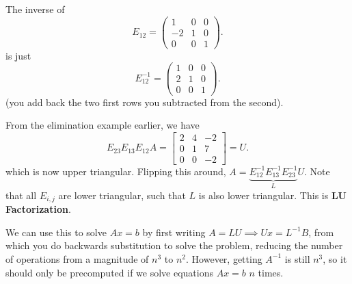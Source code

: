 \begin{eg}
	The inverse of \[
		E_{12} = \begin{pmatrix}
			1 & 0 & 0 \\ -2 & 1 & 0 \\ 0 & 0 & 1
		\end{pmatrix}
	.\] is just \[
		E_{12}^{-1}  = \begin{pmatrix}
			1 & 0 & 0 \\ 2 & 1 & 0 \\ 0 & 0 & 1
		\end{pmatrix}
	.\] (you add back the two first rows you subtracted from the second).
\end{eg}

From the elimination example earlier, we have \[
	E_{23}E_{13}E_{12}A = \begin{bmatrix}
		2 & 4 & -2 \\
		0 & 1 & 7 \\
		0 & 0 & -2  
	\end{bmatrix} = U
.\] which is now upper triangular. Flipping this around, \( A = \underbrace{E_{12}^{-1}E_{13}^{-1}E_{23}^{-1}}_{L}U \). Note that all \( E_{i,j} \) are lower triangular, such that \( L \) is also lower triangular. This is \textbf{LU Factorization}.

We can use this to solve \( Ax=b \) by first writing \( A=LU\implies Ux = L^{-1}B  \), from which you do backwards substitution to solve the problem, reducing the number of operations from a magnitude of \( n^{3}  \) to \( n^{2}  \). However, getting \( A^{-1}  \) is still \( n^{3}  \), so it should only be precomputed if we solve equations \( Ax=b \) \( n \) times.
